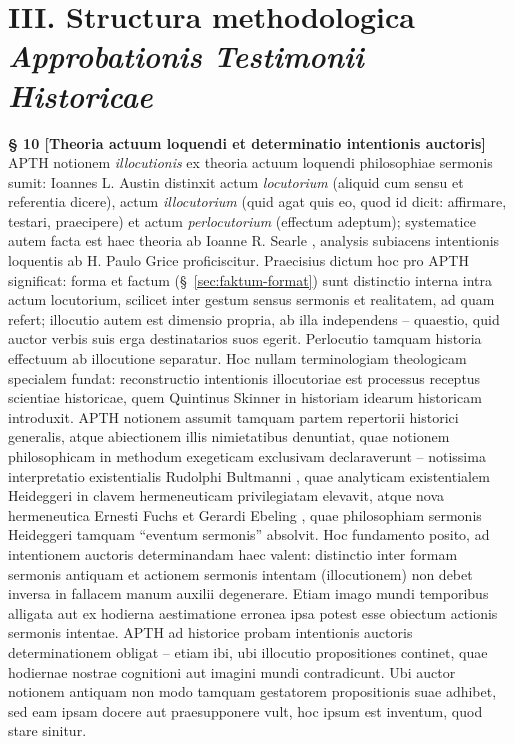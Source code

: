 \documentclass[11pt,a4paper]{article}
\makeatletter
\newcommand{\apth}{{\apthfont APTH}\hspace{0.15em}\xspace}
\newcommand{\apthsec}[3]{%
  \phantomsection%
  \def\@currentlabel{#1}%
  \label{sec:#3}%
  \textbf{§ #1 [#2]}%
}
\makeatother
\begin{document}
\section*{III. Structura methodologica \textit{Approbationis Testimonii Historicae}}

\apthsec{10}{Theoria actuum loquendi et determinatio intentionis auctoris}{sprechakttheorie} \apth notionem \textit{illocutionis} ex theoria actuum loquendi philosophiae sermonis sumit: Ioannes L. Austin \citeyearpar{austin1962} distinxit actum \textit{locutorium} (aliquid cum sensu et referentia dicere), actum \textit{illocutorium} (quid agat quis eo, quod id dicit: affirmare, testari, praecipere) et actum \textit{perlocutorium} (effectum adeptum); systematice autem facta est haec theoria ab Ioanne R. Searle \citeyearpar{searle1969}, analysis subiacens intentionis loquentis ab H. Paulo Grice \citeyearpar{grice1957} proficiscitur. Praecisius dictum hoc pro \apth significat: forma et factum (§~\ref{sec:faktum-format}) sunt distinctio interna intra actum locutorium, scilicet inter gestum sensus sermonis et realitatem, ad quam refert; illocutio autem est dimensio propria, ab illa independens -- quaestio, quid auctor verbis suis erga destinatarios suos egerit. Perlocutio tamquam historia effectuum ab illocutione separatur. Hoc nullam terminologiam theologicam specialem fundat: reconstructio intentionis illocutoriae est processus receptus scientiae historicae, quem Quintinus Skinner \citeyearpar{skinner1969} in historiam idearum historicam introduxit. \apth notionem assumit tamquam partem repertorii historici generalis, atque abiectionem illis nimietatibus denuntiat, quae notionem philosophicam in methodum exegeticam exclusivam declaraverunt -- notissima interpretatio existentialis Rudolphi Bultmanni \citeyearpar{bultmann1941}, quae analyticam existentialem Heideggeri in clavem hermeneuticam privilegiatam elevavit, atque nova hermeneutica Ernesti Fuchs \citeyearpar{fuchs1959} et Gerardi Ebeling \citeyearpar{ebeling1967}, quae philosophiam sermonis Heideggeri tamquam ``eventum sermonis'' absolvit. Hoc fundamento posito, ad intentionem auctoris determinandam haec valent: distinctio inter formam sermonis antiquam et actionem sermonis intentam (illocutionem) non debet inversa in fallacem manum auxilii degenerare. Etiam imago mundi temporibus alligata aut ex hodierna aestimatione erronea ipsa potest esse obiectum actionis sermonis intentae. \apth ad historice probam intentionis auctoris determinationem obligat -- etiam ibi, ubi illocutio propositiones continet, quae hodiernae nostrae cognitioni aut imagini mundi contradicunt. Ubi auctor notionem antiquam non modo tamquam gestatorem propositionis suae adhibet, sed eam ipsam docere aut praesupponere vult, hoc ipsum est inventum, quod stare sinitur.
\end{document}
